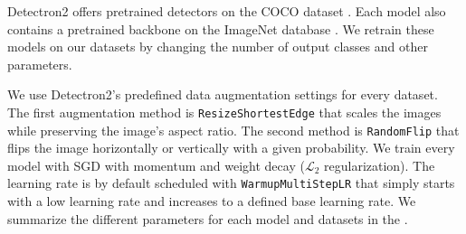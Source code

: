 Detectron2 offers pretrained detectors on the COCO dataset \cite{coco}. Each
model also contains a pretrained backbone on the ImageNet database
\cite{imagenet}. We retrain these models on our datasets by changing the number
of output classes and other parameters.

We use Detectron2's predefined data augmentation settings for every dataset. The
first augmentation method is \texttt{ResizeShortestEdge} that scales the images
while preserving the image's aspect ratio. The second method is
\texttt{RandomFlip} that flips the image horizontally or vertically with a given
probability. We train every model with SGD with momentum and weight decay
($\mathcal{L}_2$ regularization). The learning rate is by default scheduled with
\texttt{WarmupMultiStepLR} that simply starts with a low learning rate and
increases to a defined base learning rate. We summarize the different parameters
for each model and datasets in the .

